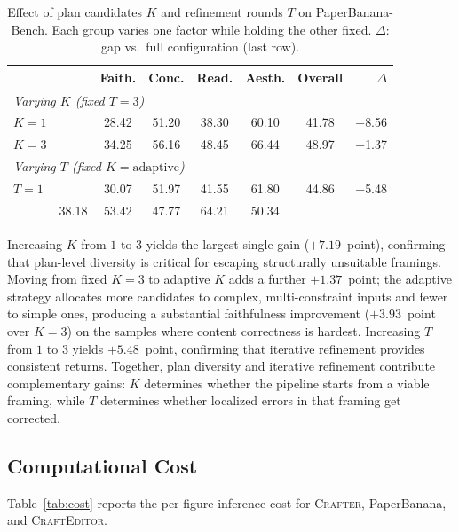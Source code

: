 \documentclass{llmxive}
\providecommand{\Crafter}{\textsc{Crafter}\xspace}
\providecommand{\Editor}{\textsc{CraftEditor}\xspace}
\providecommand{\PaperBananaBench}{PaperBanana-Bench\xspace}
\begin{document}
\begin{table}[!htbp]
\centering
\small
\begin{tabular}{@{}ll ccccc r@{}}
\toprule
& & \textbf{Faith.} & \textbf{Conc.} & \textbf{Read.} & \textbf{Aesth.} & \textbf{Overall} & \textbf{$\Delta$} \\
\midrule
\multicolumn{8}{l}{\emph{Varying $K$ (fixed $T{=}3$)}} \\
$K{=}1$        && 28.42 & 51.20 & 38.30 & 60.10 & 41.78 & $-$8.56 \\
$K{=}3$        && 34.25 & 56.16 & 48.45 & 66.44 & 48.97 & $-$1.37 \\
\midrule
\multicolumn{8}{l}{\emph{Varying $T$ (fixed $K{=}\text{adaptive}$)}} \\
$T{=}1$        && 30.07 & 51.97 & 41.55 & 61.80 & 44.86 & $-$5.48 \\
\midrule
\rowcolor{blue!5}
\multicolumn{2}{l}{\textbf{Full} ($K{=}\text{adaptive},\; T{=}3$)} & 38.18 & 53.42 & 47.77 & 64.21 & 50.34 & \\
\bottomrule
\end{tabular}
\caption{Effect of plan candidates $K$ and refinement rounds $T$ on \PaperBananaBench. Each group varies one factor while holding the other fixed. $\Delta$: gap vs.\ full configuration (last row).}
\label{tab:scaling-kt}
\end{table}

Increasing $K$ from $1$ to $3$ yields the largest single gain ($+7.19$~point), confirming that plan-level diversity is critical for escaping structurally unsuitable framings. Moving from fixed $K{=}3$ to adaptive $K$ adds a further $+1.37$~point; the adaptive strategy allocates more candidates to complex, multi-constraint inputs and fewer to simple ones, producing a substantial faithfulness improvement ($+3.93$~point over $K{=}3$) on the samples where content correctness is hardest. Increasing $T$ from $1$ to $3$ yields $+5.48$~point, confirming that iterative refinement provides consistent returns. Together, plan diversity and iterative refinement contribute complementary gains: $K$ determines whether the pipeline starts from a viable framing, while $T$ determines whether localized errors in that framing get corrected.

\subsection{Computational Cost}
\label{app:cost}

Table~\ref{tab:cost} reports the per-figure inference cost for \Crafter, PaperBanana, and \Editor.
\end{document}
